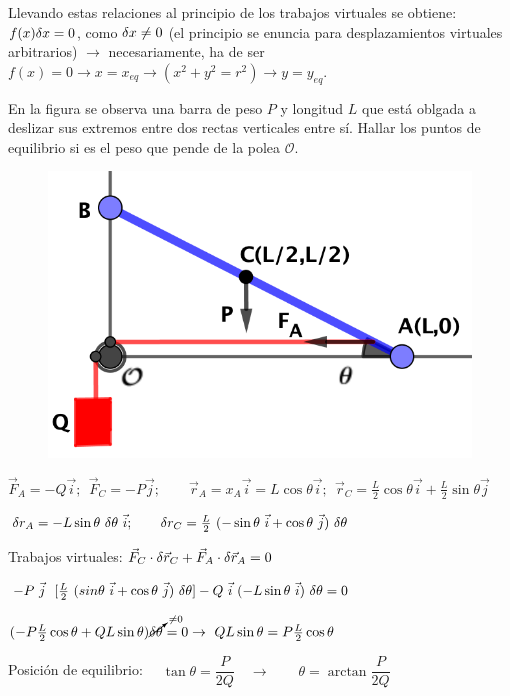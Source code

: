 Llevando estas relaciones al principio de los trabajos virtuales se obtiene: $f(x)\var x=0$, como $\var x \neq 0$ (el principio se enuncia para desplazamientos virtuales arbitrarios) $\to$ necesariamente, ha de ser $f(x)=0 \to x=x_{eq} \to (x^2+y^2=r^2) \to y=y_{eq}$.

\rightline{\textsf{\textcolor{DarkBlue}{--- Inacabado ---}}}

\begin{prob}
\begin{multicols}{2}
En la figura se observa una barra de peso $P$ y longitud $L$ que está oblgada a deslizar sus extremos entre dos rectas verticales entre sí. Hallar los puntos de equilibrio si es el peso que pende de la polea $\mathcal O$.
\begin{figure}[H]
	\centering
	\includegraphics[width=.4\textwidth]{imagenes/imagenes06/T06IM09.png}
\end{figure}
\end{multicols}	
\end{prob}

$\vec F_A=-Q \vec i; \ \ \vec F_C=-P \vec j; \qquad \vec r_A=x_A \vec i = L\cos \theta \vec i; \ \  \vec r_C=\frac L 2 \cos \theta \vec i + \frac L 2 \sin \theta \vec j$

$\var r_A=-L\sin \theta \ \var \theta \ \vec i; \qquad \var r_C= \frac L 2 \ (-\sin \theta \ \vec i + \cos \theta \ \vec j)\ \var \theta$


Trabajos virtuales: $\vec F_C \cdot \var \vec r_C+\vec F_A \cdot \var \vec r_A=0$

$-P\ \vec j \ \ [\frac L 2\ (\-sin \theta \ \vec i + \cos \theta \ \vec j) \ \var \theta] - Q\ \vec i \ (-L \sin \theta \ \vec i) \ \var \theta =0$

$(-P \frac L 2 \cos \theta + Q L \sin \theta ) \cancelto{\neq 0}{\var \theta}=0 \to \ QL\sin \theta=P\frac L 2 \cos \theta$

Posición de equilibrio: $\quad \tan \theta=\dfrac P{2Q} \quad \to \qquad \theta=\arctan \dfrac{P}{2Q}$


